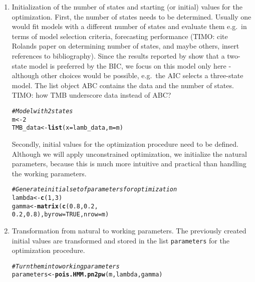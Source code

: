 \documentclass[bimj,fleqn]{w-art}\usepackage[]{graphicx}\usepackage[]{color}
\makeatletter
\newcommand{\hlnum}[1]{\textcolor[rgb]{0.686,0.059,0.569}{#1}}%
\newcommand{\hlcom}[1]{\textcolor[rgb]{0.678,0.584,0.686}{\textit{#1}}}%
\newcommand{\hlstd}[1]{\textcolor[rgb]{0.345,0.345,0.345}{#1}}%
\newcommand{\hlkwb}[1]{\textcolor[rgb]{0.69,0.353,0.396}{#1}}%
\newcommand{\hlkwc}[1]{\textcolor[rgb]{0.333,0.667,0.333}{#1}}%
\newcommand{\hlkwd}[1]{\textcolor[rgb]{0.737,0.353,0.396}{\textbf{#1}}}%
\newenvironment{kframe}{%
 \def\at@end@of@kframe{}%
 \ifinner\ifhmode%
  \def\at@end@of@kframe{\end{minipage}}%
  \begin{minipage}{\columnwidth}%
 \fi\fi%
 \def\FrameCommand##1{\hskip\@totalleftmargin \hskip-\fboxsep
 \colorbox{shadecolor}{##1}\hskip-\fboxsep
     \hskip-\linewidth \hskip-\@totalleftmargin \hskip\columnwidth}%
 \MakeFramed {\advance\hsize-\width
   \@totalleftmargin\z@ \linewidth\hsize
   \@setminipage}}%
 {\par\unskip\endMakeFramed%
 \at@end@of@kframe}
\newenvironment{knitrout}{}{} %
\theoremstyle{plain}
\theoremstyle{definition}
\makeatother
\begin{document}
\begin{enumerate}
\item Initialization of the number of states and starting (or initial) values for the optimization. First, the number of states needs to be determined. Usually one would fit models with a different number of states and evaluate them e.g.~in terms of model selection criteria, forecasting performance (TIMO: cite Rolands paper on determining number of states, and maybe others, insert references to bibliography). Since the results reported by \citet{leroux} show that a two-state model is preferred by the BIC, we focus on this model only here - although other choices would be possible, e.g.~the AIC selects a three-state model. The list object ABC contains the data and the number of states.\\
TIMO: how TMB underscore data instead of ABC?
\begin{knitrout}
\color{fgcolor}\begin{kframe}
\begin{alltt}
\hlcom{# Model with 2 states}
\hlstd{m} \hlkwb{<-} \hlnum{2}
\hlstd{TMB_data} \hlkwb{<-} \hlkwd{list}\hlstd{(}\hlkwc{x} \hlstd{= lamb_data,} \hlkwc{m} \hlstd{= m)}
\end{alltt}
\end{kframe}
\end{knitrout}
Secondly, initial values for the optimization procedure need to be defined. Although we will apply unconstrained optimization, we initialize the natural parameters, because this is much more intuitive and practical than handling the working parameters. 
\begin{knitrout}
\color{fgcolor}\begin{kframe}
\begin{alltt}
\hlcom{# Generate initial set of parameters for optimization}
\hlstd{lambda} \hlkwb{<-} \hlkwd{c}\hlstd{(}\hlnum{1}\hlstd{,} \hlnum{3}\hlstd{)}
\hlstd{gamma} \hlkwb{<-} \hlkwd{matrix}\hlstd{(}\hlkwd{c}\hlstd{(}\hlnum{0.8}\hlstd{,} \hlnum{0.2}\hlstd{,}
                  \hlnum{0.2}\hlstd{,} \hlnum{0.8}\hlstd{),} \hlkwc{byrow} \hlstd{=} \hlnum{TRUE}\hlstd{,} \hlkwc{nrow} \hlstd{= m)}
\end{alltt}
\end{kframe}
\end{knitrout}

\item Transformation from natural to working parameters. The previously created initial values are transformed and stored in the list {\tt parameters} for the optimization procedure.
\begin{knitrout}
\color{fgcolor}\begin{kframe}
\begin{alltt}
\hlcom{# Turn them into working parameters}
\hlstd{parameters} \hlkwb{<-} \hlkwd{pois.HMM.pn2pw}\hlstd{(m, lambda, gamma)}
\end{alltt}
\end{kframe}
\end{knitrout}


\end{enumerate}
\end{document}
